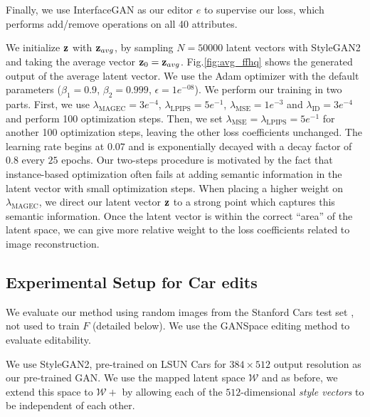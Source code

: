     
Finally, we use InterfaceGAN 
\citep{shen2020} as our editor $e$ to supervise our \magec loss, 
which performs 
add/remove operations on all 40 attributes. 



We initialize $\mathbf{z}$ with $\mathbf{z}_{avg}$, by sampling 
$N = 50000$ latent vectors with StyleGAN2 and taking the average vector $\mathbf{z}_0 = \mathbf{z}_{avg}$. 
Fig.\ref{fig:avg_ffhq} shows the generated output of the average latent vector.
We use the Adam optimizer \citep{adam} with the default parameters 
($\beta_1=0.9$, $\beta_2=0.999$, $\epsilon=1e^{-08}$). We perform our training in two
 parts. First,
we use $\lambda_{\text{MAGEC}} = 3e^{-4}$, $\lambda_{\text{LPIPS}} = 5e^{-1}$, 
$\lambda_{\text{MSE}} = 1e^{-3}$ and $\lambda_{\text{ID}} = 3e^{-4}$ and perform 100 
optimization
 steps. Then, we set $\lambda_{\text{MSE}} =  \lambda_{\text{LPIPS}} = 5e^{-1}$ for another 
 100 
 optimization steps, leaving the other loss coefficients unchanged. The learning rate 
 begins at $0.07$ and is exponentially decayed with a decay factor of $0.8$ every 
 $25$ epochs. Our two-steps procedure is motivated by the fact that 
 instance-based optimization often fails at adding semantic information
  in the 
 latent vector with small optimization steps. When placing a higher weight 
 on
  $\lambda_{\text{MAGEC}}$, we direct our latent vector $\mathbf{z}$ to a strong point which 
  captures 
  this semantic information. Once the latent vector is within the correct 
  ``area'' of 
  the latent space, we can give more relative weight to the loss coefficients 
  related 
  to image reconstruction.



 \subsection{Experimental Setup for Car edits}

 We evaluate  our method using random 
 images from the Stanford Cars test set \citep{stanford_cars}, not 
 used to train $F$ (detailed below). We use the GANSpace 
 \citep{harkonen2020ganspace}
  editing method to evaluate editability.

We use StyleGAN2, pre-trained on LSUN Cars for $384 \times 512$ output resolution
as our
pre-trained GAN. We use the mapped latent space $\mathcal{W}$ and as before,
we extend this
space to $\mathcal{W+}$ by allowing each of the $512$-dimensional \emph{style vectors}
  to be independent of each other. 


